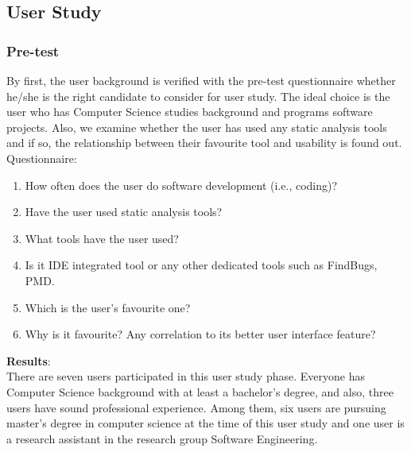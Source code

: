 \subsection{User Study}

\subsubsection{Pre-test}

By first, the user background is verified with the pre-test questionnaire whether he/she is the right candidate to consider for user study. The ideal choice is the user who has Computer Science studies background and programs software projects. Also, we examine whether the user has used any static analysis tools and if so, the relationship between their favourite tool and usability is found out. \\

Questionnaire: \\

\begin{enumerate}
\item How often does the user do software development (i.e., coding)?
\item Have the user used static analysis tools?
\item What tools have the user used?
\item Is it IDE integrated tool or any other dedicated tools such as FindBugs, PMD.
\item Which is the user’s favourite one? 
\item Why is it favourite? Any correlation to its better user interface feature? \\
\end{enumerate}

\textbf{Results}: \\

There are seven users participated in this user study phase. Everyone has Computer Science background with at least a bachelor’s degree, and also, three users have sound professional experience. Among them, six users are pursuing master’s degree in computer science at the time of this user study and one user is a research assistant in the research group Software Engineering.  \\ \\

